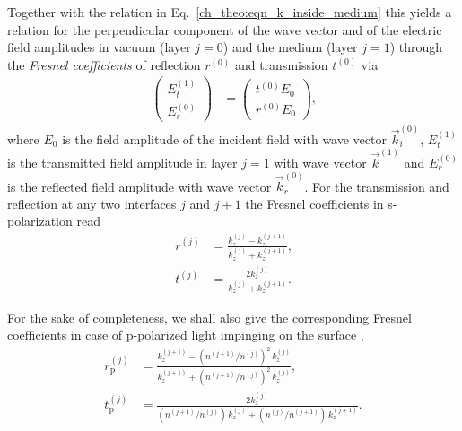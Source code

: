 Together with the relation in Eq.~\ref{ch_theo:eqn_k_inside_medium} this yields a relation for the perpendicular component of the wave vector and of the electric field amplitudes in vacuum (layer $j=0$) and the medium (layer $j=1$) through the \emph{Fresnel coefficients} of reflection $r^{(0)}$ and transmission $t^{(0)}$ via
\begin{align}
\begin{pmatrix}
E_t^{(1)}  \\ 
E_r^{(0)}
\end{pmatrix} &=
\begin{pmatrix}
t^{(0)} E_0 \\
r^{(0)} E_0
\end{pmatrix} \text{,} \label{ch_theo:eqn_fresnel_reflection}
\end{align}
where $E_0$ is the field amplitude of the incident field with wave vector $\vec{k}_i^{(0)}$, $E_t^{(1)}$ is the transmitted field amplitude in layer $j=1$ with wave vector $\vec{k}^{(1)}$ and $E_r^{(0)}$ is the reflected field amplitude with wave vector $\vec{k}_r^{(0)}$. For the transmission and reflection at any two interfaces $j$ and $j+1$ the Fresnel coefficients in s-polarization read
\begin{align}
        r^{(j)} &= \frac{k_z^{(j)} - k_z^{(j+1)}}{k_z^{(j)} + 
k_z^{(j+1)}}\text{,}  \label{ch_theo:eqn_fresnel_reflection_coefficient}\\
        t^{(j)} &= \frac{2 k_z^{(j)}}{k_z^{(j)} + k_z^{(j+1)}}\text{.}  \label{ch_theo:eqn_fresnel_transmission_coefficient}
\end{align}

For the sake of completeness, we shall also give the corresponding Fresnel coefficients in case of p-polarized light impinging on the surface \cite{born_principles_1965},
\begin{align}
        r_\text{p}^{(j)} &= \frac{k_z^{(j+1)} - (n^{(j+1)}/ n^{(j)})^2 \,k_z^{(j)}}{k_z^{(j+1)} + (n^{(j+1)}/ n^{(j)})^2\, k_z^{(j)}}\text{,}  \label{ch_theo:eqn_fresnel_reflection_coefficient}\\
        t_\text{p}^{(j)} &= \frac{2 k_z^{(j)}}{(n^{(j+1)}/ n^{(j)}) \,k_z^{(j)} +  (n^{(j)}/ n^{(j+1)})\, k_z^{(j+1)}}\text{.}  \label{ch_theo:eqn_fresnel_transmission_coefficient_p_pol}
\end{align}


